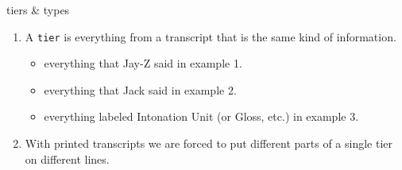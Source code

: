 \documentclass{beamer}
\begin{document}
   \begin{frame}{tiers \& types}
      \begin{enumerate}
        \item<1-> A \texttt{tier} is everything from a transcript that is the same kind of information.
          \begin{itemize}
            \item<2-> everything that Jay-Z said in example 1.
            \item<2-> everything that Jack said in example 2. 
            \item<2-> everything labeled Intonation Unit (or Gloss, etc.) in example 3.
          \end{itemize}
        \item<3-> With printed transcripts we are forced to put different parts of a single tier on different lines.
      \end{enumerate}
    \end{frame}
    
\end{document}
